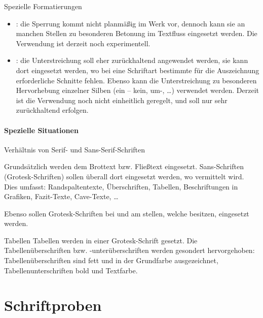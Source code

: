 \documentclass[
ngerman,
paper=a4,
asymmetric,
fontsize=10pt,
draft=false,
numbers=noenddot,
bibtotocnumbered,
footnotes=multiple,
toc=flat,
]{scrbook}
\begin{document}
\Text
{Spezielle Formatierungen}
{%
\begin{itemize}
  \item {}: die Sperrung kommt nicht planmäßig im Werk vor,
  dennoch kann sie an manchen Stellen zu besonderen Betonung
  im Textfluss eingesetzt werden. Die Verwendung ist derzeit
  noch experimentell.
  \item {}: die Unterstreichung soll eher zurückhaltend
  angewendet werden, sie kann dort eingesetzt
  werden, wo bei eine Schriftart bestimmte für die
  Auszeichnung erforderliche Schnitte fehlen. Ebenso kann die
  Unterstreichung zu besonderen Hervorhebung einzelner Silben
  (ein – kein, um-, \ldots) verwendet werden. Derzeit ist die
  Verwendung noch nicht einheitlich geregelt, und soll nur
  sehr zurückhaltend erfolgen.
\end{itemize}}
{}
{}
{}
{}






\subsubsection{Spezielle Situationen}




\Text
{Verhältnis von Serif- und Sans-Serif-Schriften}
{Grundsätzlich werden dem Brottext bzw. Fließtext
 eingesetzt. Sans-Schriften
(Grotesk-Schriften) sollen überall dort eingesetzt werden,
wo  vermittelt wird. Dies umfasst:
Randspaltentexte, Überschriften, Tabellen, Beschriftungen in Grafiken, Fazit-Texte, Cave-Texte, \ldots

Ebenso sollen Grotesk-Schriften bei  und am
stellen, welche  besitzen, eingesetzt
werden. }
{}
{}
{}
{}




\Text
{Tabellen}
{Tabellen werden in einer Grotesk-Schrift gesetzt. Die
Tabellenüberschriften bzw. -unterüberschriften werden
gesondert hervorgehoben: Tabellenüberschriften sind fett
und in der Grundfarbe ausgezeichnet, Tabellenunterschriften
bold und Textfarbe. }
{}
{}
{}
{}



\appendix

\chapter{Schriftproben}

\minitoc
\end{document}
